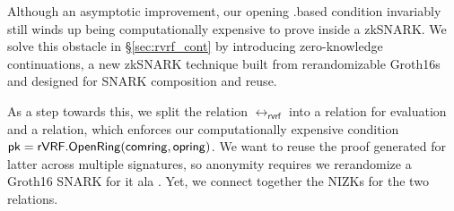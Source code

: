 


Although an asymptotic improvement, our opening \rVRF.\OpenRing based condition invariably
still winds up being computationally expensive to prove inside a zkSNARK.
We solve this obstacle in \S\ref{sec:rvrf_cont}  by introducing
zero-knowledge continuations, a new zkSNARK technique built from
rerandomizable Groth16s \cite{Groth16} and designed for SNARK composition and reuse.

As a step towards this, we split the relation $ \rel_{\mathsf{rvrf}} $ into a relation
for \rVRF evaluation and a relation, which enforces our
computationally expensive condition $\mathsf{pk} = {\mathsf{rVRF}}.{\mathsf{OpenRing}}(\mathsf{comring},\mathsf{opring})$.
We want to reuse the proof generated for latter across multiple \rVRF signatures, so anonymity
requires we rerandomize a Groth16 SNARK for it
ala \cite[Theorem 3, Appendix C, pp. 31]{RandomizationGroth16}.
%
Yet, we connect together the NIZKs for the two relations.

%


%

